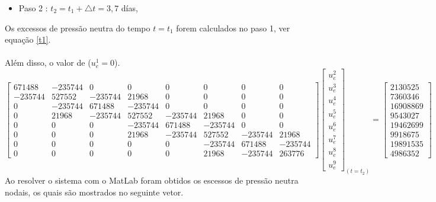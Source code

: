 \documentclass{article} %
\begin{document}
\begin{itemize}
	\item Paso 2 : \(t_2=t_1+\triangle t=3,7\) días,
\end{itemize}

Os excessos de pressão neutra do tempo \(t=t_1\) forem calculados no paso 1, ver equação \ref{t1}.\\
\\
\indent Além disso, o valor de (\(u_e^1=0\)).\\

\begin{equation*}
\begin{bmatrix}
671488& -235744& 0& 0& 0& 0& 0& 0\\
-235744&527552&-235744&21968& 0& 0& 0& 0\\
0&-235744&671488&-235744& 0& 0& 0& 0\\
0&21968&-235744&527552&-235744&21968& 0& 0\\
0&0&0& -235744&671488&-235744& 0& 0\\
0&0&0&21968&-235744&527552&-235744&21968\\
0&0&0&0&0&-235744&671488&-235744\\
0&0&0&0&0&21968&-235744&263776
\end{bmatrix}\begin{bmatrix}
u_e^2\\
u_e^3\\
u_e^4\\
u_e^5\\
u_e^6\\
u_e^7\\
u_e^8\\
u_e^9
\end{bmatrix}_{(t=t_2)}
=\begin{bmatrix}
2130525\\
7360346\\
16908869\\
9543027\\
19462699\\
9918675\\
19891535\\
4986352
\end{bmatrix}
\end{equation*}
\indent Ao resolver o sistema com o MatLab foram obtidos os escessos de pressão neutra nodais, os quais são mostrados no seguinte vetor.
\end{document}
